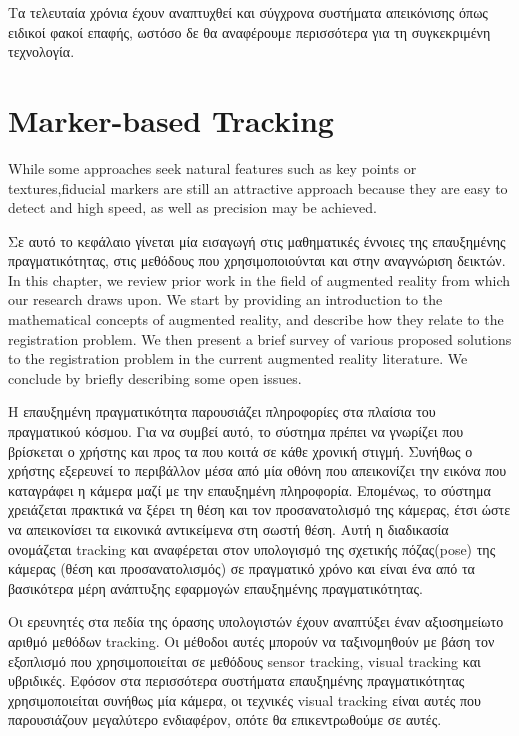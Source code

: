 Τα τελευταία χρόνια έχουν αναπτυχθεί και σύγχρονα συστήματα απεικόνισης όπως ειδικοί φακοί επαφής, ωστόσο δε θα αναφέρουμε περισσότερα για τη συγκεκριμένη τεχνολογία.





\section{Marker-based Tracking}

While some approaches seek natural features such as key points or textures,fiducial markers are still an attractive approach because they are easy to detect and high speed, as well as precision may be achieved.


Σε αυτό το κεφάλαιο γίνεται μία εισαγωγή στις μαθηματικές έννοιες της επαυξημένης πραγματικότητας, στις μεθόδους που χρησιμοποιούνται και στην αναγνώριση δεικτών.  
In this chapter, we review prior work in the field of augmented reality from which our research draws upon. We start by providing an introduction to the mathematical concepts of augmented reality, and describe how they relate to the registration problem. We then present a brief survey of various proposed solutions to the registration problem in the current augmented reality literature. We conclude by briefly describing some open issues.




Η επαυξημένη πραγματικότητα παρουσιάζει πληροφορίες στα πλαίσια του πραγματικού κόσμου. Για να συμβεί αυτό, το σύστημα πρέπει να γνωρίζει που βρίσκεται ο χρήστης και προς τα που κοιτά σε κάθε χρονική στιγμή. Συνήθως ο χρήστης εξερευνεί το περιβάλλον μέσα από μία οθόνη που απεικονίζει την εικόνα που καταγράφει η κάμερα μαζί με την επαυξημένη πληροφορία.  
Επομένως, το σύστημα χρειάζεται πρακτικά να ξέρει τη θέση και τον προσανατολισμό της κάμερας, έτσι ώστε να απεικονίσει τα εικονικά αντικείμενα στη σωστή θέση. Αυτή η διαδικασία ονομάζεται tracking και αναφέρεται στον υπολογισμό της σχετικής πόζας(pose) της κάμερας (θέση και προσανατολισμός) σε πραγματικό χρόνο και είναι ένα από τα βασικότερα μέρη ανάπτυξης εφαρμογών επαυξημένης πραγματικότητας.


Οι ερευνητές στα πεδία της όρασης υπολογιστών έχουν αναπτύξει έναν αξιοσημείωτο αριθμό μεθόδων tracking. Οι μέθοδοι αυτές μπορούν να ταξινομηθούν με βάση τον εξοπλισμό που χρησιμοποιείται σε μεθόδους sensor tracking, visual tracking και υβριδικές. Εφόσον στα περισσότερα συστήματα επαυξημένης πραγματικότητας χρησιμοποιείται συνήθως μία κάμερα, οι τεχνικές visual tracking είναι αυτές που παρουσιάζουν μεγαλύτερο ενδιαφέρον, οπότε θα επικεντρωθούμε σε αυτές.


